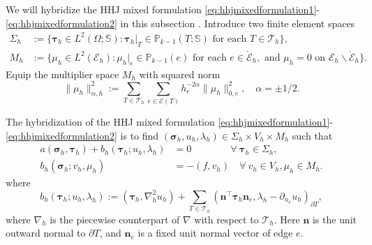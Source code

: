 We will hybridize the HHJ mixed formulation \eqref{eq:hhjmixedformulation1}-\eqref{eq:hhjmixedformulation2} in this subsection \cite{ArnoldBrezzi1985,HuangHuang2016,HuangHuang2019}. Introduce two finite element spaces
\begin{align*}
\Sigma_h&:=\{\boldsymbol{\tau}_h\in L^{2}(\Omega ; \mathbb{S}): \boldsymbol{\tau}_h|_T\in \mathbb P_{k-1}(T ; \mathbb{S})  \text { for each }  T \in \mathcal{T}_{h}\}, \\
M_h&:=\{\mu_h\in L^2(\mathcal{E}_{h}): \mu_h|_e\in \mathbb P_{k-1}(e) \text { for each } e \in \mathring{\mathcal{E}}_{h}, \text { and } \mu_h=0 \text { on } \mathcal{E}_{h}\backslash\mathring{\mathcal{E}}_{h}\}.
\end{align*}
Equip the multiplier space $M_h$ with squared norm
$$
\|\mu_h\|_{\alpha,h}^2:=\sum_{T\in\mathcal T_h}\sum_{e\in\mathcal{E}(T)}h_e^{-2\alpha}\|\mu_h\|_{0,e}^2,\quad \alpha=\pm1/2.
$$

The hybridization of the HHJ mixed formulation \eqref{eq:hhjmixedformulation1}-\eqref{eq:hhjmixedformulation2} is to find $(\boldsymbol{\sigma}_h, u_h,\lambda_h)\in \Sigma_h\times V_h\times M_h$ such that
\begin{align}
a(\boldsymbol\sigma_h, \boldsymbol\tau_h)+ b_h(\boldsymbol\tau_h; u_h,\lambda_h) & =0 \quad\quad\quad\;\;\;\, \forall~\boldsymbol\tau_h\in \Sigma_h, \label{eq:hybirdmfem1}\\
b_h(\boldsymbol\sigma_h; v_h,\mu_h) & =-(f, v_h)  \quad \forall~v_h\in V_h, \mu_h\in M_h. \label{eq:hybirdmfem2}
\end{align}
where
\[
b_h(\boldsymbol\tau_h; u_h,\lambda_h):=(\boldsymbol{\tau}_h, \nabla_h^2u_h) + \sum_{T\in \mathcal{T}_{h}}(\boldsymbol{n}^{\intercal}\boldsymbol{\tau}_h\boldsymbol{n}_e, \lambda_h-\partial_{n_e}u_h)_{\partial T},
\]
where $\nabla_h$ is the piecewise counterpart of $\nabla$ with respect to $\mathcal T_h$.
Here $\boldsymbol{n}$ is the unit outward normal to $\partial T$, and $\boldsymbol{n}_e$ is a fixed unit normal vector of edge $e$.

